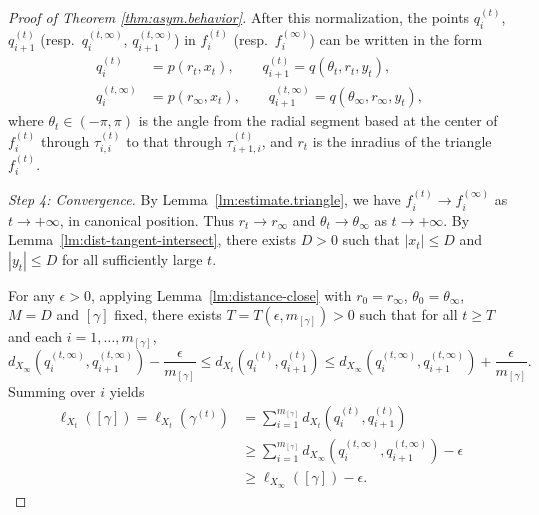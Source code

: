 \documentclass[11pt, letterpaper]{amsart}
\theoremstyle{definition}
\theoremstyle{remark}
\numberwithin{equation}{section}
\begin{document}
\begin{proof}[Proof of Theorem \ref{thm:asym.behavior}]
After this normalization, the points \(q_i^{(t)}\), \(q_{i+1}^{(t)}\) (resp.\ \(q_{i}^{(t,\infty)}\), \(q_{i+1}^{(t,\infty)}\)) in \(f_i^{(t)}\) (resp.\ \(f_i^{(\infty)}\)) can be written in the form
\[
\begin{split}
q_i^{(t)} &= p(r_t,x_t), \qquad q_{i+1}^{(t)} = q(\theta_t, r_t,y_t),\\
q_i^{(t,\infty)} &= p(r_{\infty},x_{t}), \qquad q_{i+1}^{(t,\infty)} = q(\theta_{\infty}, r_{\infty}, y_{t}),
\end{split}
\]
where \(\theta_t\in (-\pi,\pi)\) is the angle from the radial segment based at the center of $f_i^{(t)}$ through \(\tau_{i,i}^{(t)}\) to that through \(\tau_{i+1,i}^{(t)}\), and \(r_t\) is the inradius of the triangle \(f^{(t)}_i\).

\medskip\noindent\emph{Step 4: Convergence.}
By Lemma~\ref{lm:estimate.triangle}, we have \(f_i^{(t)}\to f_i^{(\infty)}\) as \(t\to +\infty\), in canonical position. Thus \(r_t\rightarrow r_{\infty}\) and \(\theta_t\rightarrow \theta_{\infty}\) as \(t\rightarrow +\infty\). By Lemma~\ref{lm:dist-tangent-intersect}, there exists \(D>0\) such that \(|x_t|\leq D\) and  \(|y_t|\leq D\) for all sufficiently large \(t\). 

For any \(\epsilon>0\), applying Lemma~\ref{lm:distance-close} with \(r_0=r_{\infty}\), \(\theta_0=\theta_{\infty}\), \(M=D\) and \([\gamma]\) fixed, there exists \(T=T(\epsilon, m_{[\gamma]})>0\) such that for all \(t\geq T\) and each \(i=1,\dots,m_{[\gamma]}\),
\[
d_{X_{\infty}}(q_i^{(t,\infty)},q_{i+1}^{(t,\infty)})-\frac{\epsilon}{m_{[\gamma]}}
\leq d_{X_t}(q_i^{(t)},q_{i+1}^{(t)})
\leq d_{X_{\infty}}(q_i^{(t,\infty)},q_{i+1}^{(t,\infty)})+\frac{\epsilon}{m_{[\gamma]}}.
\]
Summing over \(i\) yields
\[
\begin{split}
  \ell_{X_t}([\gamma])=\ell_{X_t}(\gamma^{(t)})
  &=\sum_{i=1}^{m_{[\gamma]}}d_{X_t}(q_i^{(t)},q_{i+1}^{(t)})\\
  &\geq \sum_{i=1}^{m_{[\gamma]}}d_{X_{\infty}}(q_i^{(t,\infty)},q_{i+1}^{(t,\infty)})-\epsilon\\
  &\geq \ell_{X_{\infty}}([\gamma])-\epsilon.
\end{split}
\]


\end{proof}
\end{document}
